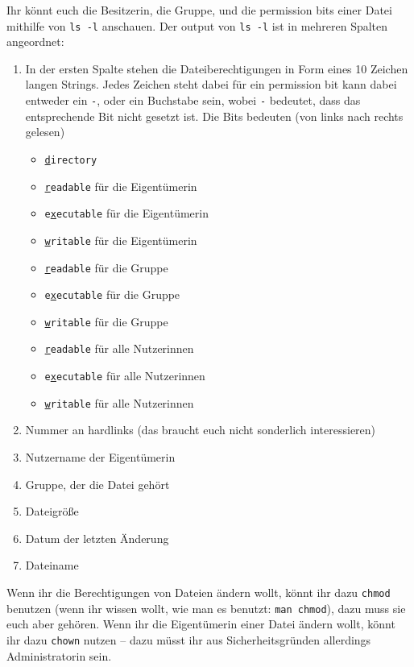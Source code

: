 Ihr könnt euch die Besitzerin, die Gruppe, und die permission bits einer Datei
mithilfe von \texttt{ls -l} anschauen. Der output von \texttt{ls -l} ist in
mehreren Spalten angeordnet:
\begin{enumerate}
    \item In der ersten Spalte stehen die Dateiberechtigungen in Form eines 10
        Zeichen langen Strings. Jedes Zeichen steht dabei für ein permission
        bit kann dabei entweder ein \texttt{-}, oder ein Buchstabe sein, wobei
        \texttt{-} bedeutet, dass das entsprechende Bit nicht gesetzt ist. Die
        Bits bedeuten (von links nach rechts gelesen)
        \begin{itemize}
            \item \texttt{\underline{d}irectory}
            \item \texttt{\underline{r}eadable} für die Eigentümerin
            \item \texttt{e\underline{x}ecutable} für die Eigentümerin
            \item \texttt{\underline{w}ritable} für die Eigentümerin
            \item \texttt{\underline{r}eadable} für die Gruppe
            \item \texttt{e\underline{x}ecutable} für die Gruppe
            \item \texttt{\underline{w}ritable} für die Gruppe
            \item \texttt{\underline{r}eadable} für alle Nutzerinnen
            \item \texttt{e\underline{x}ecutable} für alle Nutzerinnen
            \item \texttt{\underline{w}ritable} für alle Nutzerinnen
        \end{itemize}
    \item Nummer an hardlinks (das braucht euch nicht sonderlich interessieren)
    \item Nutzername der Eigentümerin
    \item Gruppe, der die Datei gehört
    \item Dateigröße
    \item Datum der letzten Änderung
    \item Dateiname
\end{enumerate}

Wenn ihr die Berechtigungen von Dateien ändern wollt, könnt ihr dazu
\texttt{chmod} benutzen (wenn ihr wissen wollt, wie man es benutzt: \texttt{man
chmod}), dazu muss sie euch aber gehören. Wenn ihr die Eigentümerin einer Datei
ändern wollt, könnt ihr dazu \texttt{chown} nutzen -- dazu müsst ihr aus
Sicherheitsgründen allerdings Administratorin sein.

